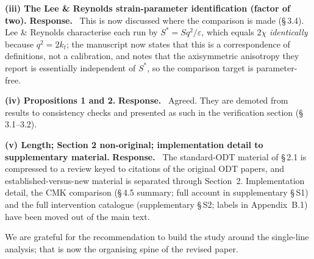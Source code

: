 \documentclass[11pt]{article}
\newcommand{\response}{\medskip\noindent\textbf{Response.}\ }
\newcommand{\point}[1]{\bigskip\noindent\textbf{#1}}
\begin{document}
\point{(iii) The Lee \& Reynolds strain-parameter identification (factor of
two).}
\response
This is now discussed where the comparison is made (\S\,3.4). Lee \&
Reynolds characterise each run by $S^{*}=Sq^2/\varepsilon$, which equals
$2\chi$ \emph{identically} because $q^2=2k_t$; the manuscript now states
that this is a correspondence of definitions, not a calibration, and notes
that the axisymmetric anisotropy they report is essentially independent of
$S^{*}$, so the comparison target is parameter-free.

\point{(iv) Propositions 1 and 2.}
\response
Agreed. They are demoted from results to consistency checks and presented
as such in the verification section (\S\,3.1--3.2).

\point{(v) Length; Section 2 non-original; implementation detail to
supplementary material.}
\response
The standard-ODT material of \S\,2.1 is compressed to a review keyed to
citations of the original ODT papers, and established-versus-new material
is separated through Section~2. Implementation detail, the CMK comparison
(\S\,4.5 summary; full account in supplementary \S\,S1) and the full
intervention catalogue (supplementary \S\,S2; labels in Appendix~B.1) have
been moved out of the main text.

\bigskip
\noindent
We are grateful for the recommendation to build the study around the
single-line analysis; that is now the organising spine of the revised
paper.
\end{document}
